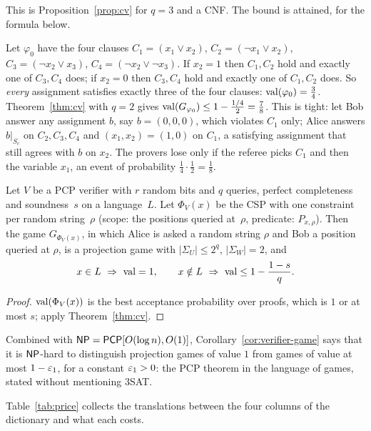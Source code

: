 \noindent
This is Proposition~\ref{prop:cv} for $q=3$ and a CNF.  The bound is attained, \eg for the formula below.

\begin{example}\label{ex:phi0}
Let $\varphi_0$ have the four clauses $C_1=(x_1\vee x_2)$, $C_2=(\neg x_1\vee x_2)$, $C_3=(\neg x_2\vee x_3)$, $C_4=(\neg x_2\vee\neg x_3)$.
If $x_2=1$ then $C_1,C_2$ hold and exactly one of $C_3,C_4$ does; if $x_2=0$ then $C_3,C_4$ hold and exactly one of $C_1,C_2$ does.
So \emph{every} assignment satisfies exactly three of the four clauses: $\operatorname{val}(\varphi_0)=\tfrac34$.  Theorem~\ref{thm:cv} with $q=2$ gives
$\operatorname{val}(G_{\varphi_0})\le1-\tfrac{1/4}{2}=\tfrac78$.  This is tight: let Bob answer any assignment $b$, say $b=(0,0,0)$, which violates $C_1$ only; Alice answers $b|_{S_c}$ on $C_2,C_3,C_4$ and
$(x_1,x_2)=(1,0)$ on $C_1$, a satisfying assignment that still agrees with $b$ on $x_2$.  The provers lose only if the referee picks $C_1$ and then the variable $x_1$, an event of
probability $\tfrac14\cdot\tfrac12=\tfrac18$.
\end{example}

\begin{corollary}\label{cor:verifier-game}
Let $V$ be a PCP verifier with $r$ random bits and $q$ queries, perfect completeness and soundness~$s$ on a language~$L$.  Let $\Phi_V(x)$ be the CSP with one
constraint per random string~$\rho$ (scope: the positions queried at~$\rho$, predicate: $P_{x,\rho}$).  Then the game
$G_{\Phi_V(x)}$, in which Alice is asked a random string $\rho$ and Bob a position queried at $\rho$, is a projection game with $|\Sigma_U|\le2^q$, $|\Sigma_W|=2$, and
\[
  x\in L\ \Rightarrow\ \operatorname{val}=1,\qquad x\notin L\ \Rightarrow\ \operatorname{val}\le1-\frac{1-s}{q}.
\]
\end{corollary}
\begin{proof}
$\operatorname{val}(\Phi_V(x))$ is the best acceptance probability over proofs, which is $1$ or at most $s$; apply Theorem~\ref{thm:cv}.
\end{proof}

\noindent
Combined with $\mathsf{NP}=\mathsf{PCP}[O(\log n),O(1)]$, Corollary~\ref{cor:verifier-game} says that it is $\mathsf{NP}$-hard to distinguish projection games of value $1$ from games of value at most $1-\varepsilon_1$, for a constant $\varepsilon_1>0$:
the PCP theorem in the language of games, stated without mentioning $3$SAT.

Table~\ref{tab:price} collects the translations between the four columns of the dictionary and what each costs.

